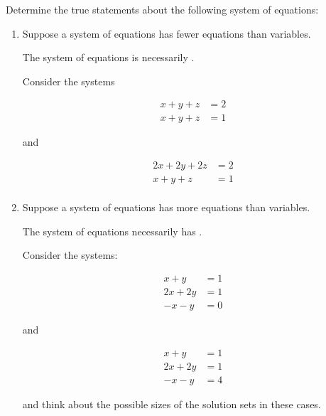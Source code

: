 \documentclass{ximera}
\author{Zack Reed}
\begin{document}
\begin{problem}

    Determine the true statements about the following system of equations:

    \begin{enumerate}

    \item Suppose a system of equations has fewer equations than
    variables. 
    
    The system of equations is necessarily .
    
    
    \begin{hint}
      Consider the systems 

        \begin{align*}
            x+y+z&=2\\
            x+y+z&=1
        \end{align*}

        and

        \begin{align*}
            2x+2y+2z&=2\\
            x+y+z&=1\\
        \end{align*}

    \end{hint}

    \item Suppose a system of equations has more equations than variables.
    
    The system of equations necessarily has
    .

    \begin{hint}
      Consider the systems:

        \begin{align*}
            x+y&=1\\
            2x+2y&=1\\
            -x-y&=0
        \end{align*}

        and

        \begin{align*}
            x+y&=1\\
            2x+2y&=1\\
            -x-y&=4
        \end{align*}

        and think about the possible sizes of the solution sets in these cases.

    \end{hint}
  

\end{enumerate}

\end{problem}
\end{document}
